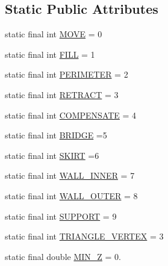 \subsection*{Static Public Attributes}
\begin{DoxyCompactItemize}
\item 
static final int \hyperlink{classandroid_1_1app_1_1printerapp_1_1viewer_1_1_data_storage_a44404040f32c757be9ee5a589f1e4994}{M\+O\+VE} = 0
\item 
static final int \hyperlink{classandroid_1_1app_1_1printerapp_1_1viewer_1_1_data_storage_ac2ffca5aedbee8881af0537091b6a685}{F\+I\+LL} = 1
\item 
static final int \hyperlink{classandroid_1_1app_1_1printerapp_1_1viewer_1_1_data_storage_a90e6fc5c64742f8e8f1bffe8eb69b51f}{P\+E\+R\+I\+M\+E\+T\+ER} = 2
\item 
static final int \hyperlink{classandroid_1_1app_1_1printerapp_1_1viewer_1_1_data_storage_af7dbe7b97d14fdb85d24cdb81fa85008}{R\+E\+T\+R\+A\+CT} = 3
\item 
static final int \hyperlink{classandroid_1_1app_1_1printerapp_1_1viewer_1_1_data_storage_aec374470f8bd7c07ec852eec4adf6e83}{C\+O\+M\+P\+E\+N\+S\+A\+TE} = 4
\item 
static final int \hyperlink{classandroid_1_1app_1_1printerapp_1_1viewer_1_1_data_storage_a105c39ce5e017f20284bb21addd95d3a}{B\+R\+I\+D\+GE} =5
\item 
static final int \hyperlink{classandroid_1_1app_1_1printerapp_1_1viewer_1_1_data_storage_a9ecf76a20cfaf10f82c42818c700b6ab}{S\+K\+I\+RT} =6
\item 
static final int \hyperlink{classandroid_1_1app_1_1printerapp_1_1viewer_1_1_data_storage_a499ae022dd1ccb50e92a763822e29788}{W\+A\+L\+L\+\_\+\+I\+N\+N\+ER} = 7
\item 
static final int \hyperlink{classandroid_1_1app_1_1printerapp_1_1viewer_1_1_data_storage_ac301c6a3bbf102afbf0610ba7d051034}{W\+A\+L\+L\+\_\+\+O\+U\+T\+ER} = 8
\item 
static final int \hyperlink{classandroid_1_1app_1_1printerapp_1_1viewer_1_1_data_storage_a9fc1d65ef49cb0d3332bbd9afa7bc845}{S\+U\+P\+P\+O\+RT} = 9
\item 
static final int \hyperlink{classandroid_1_1app_1_1printerapp_1_1viewer_1_1_data_storage_a7bc104de01f35f7d07238a880a294103}{T\+R\+I\+A\+N\+G\+L\+E\+\_\+\+V\+E\+R\+T\+EX} = 3
\item 
static final double \hyperlink{classandroid_1_1app_1_1printerapp_1_1viewer_1_1_data_storage_a2995cc403c0db43fb12f0f8e670e9dd9}{M\+I\+N\+\_\+Z} = 0.
\end{DoxyCompactItemize}



